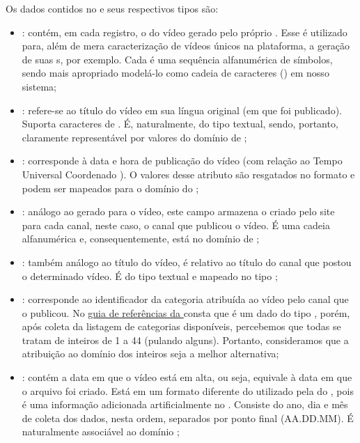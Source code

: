   Os dados contidos no  e seus respectivos tipos são:

  \begin{itemize}
    \item {}: contém, em cada registro, o  do vídeo gerado pelo próprio . Esse  é utilizado para, além de mera caracterização de vídeos únicos na plataforma, a geração de suas s, por exemplo. Cada  é uma sequência alfanumérica de símbolos, sendo mais apropriado modelá-lo como cadeia de caracteres () em nosso sistema;
    \item {}: refere-se ao título do vídeo em sua língua original (em que foi publicado). Suporta caracteres de . É, naturalmente, do tipo textual, sendo, portanto, claramente representável por valores do domínio de ;
    \item {}: corresponde à data e hora de publicação do vídeo (com relação ao Tempo Universal Coordenado ). O valores desse atributo são resgatados no formato \href{https://www.w3.org/TR/NOTE-datetime}{} e podem ser mapeados para o domínio  do ;
    \item {}: análogo ao  gerado para o vídeo, este campo armazena o  criado pelo site para cada canal, neste caso, o canal que publicou o vídeo. É uma cadeia alfanumérica e, consequentemente, está no domínio de ;
    \item {}: também análogo ao título do vídeo, é relativo ao título do canal que postou o determinado vídeo. É do tipo textual e mapeado no tipo ;
    \item {}: corresponde ao identificador da categoria atribuída ao vídeo pelo canal que o publicou. No \href{https://developers.google.com/youtube/v3/docs/videos?hl=pt-br#snippet.categoryId}{guia de referências da } consta que é um dado do tipo , porém, após coleta da listagem de categorias disponíveis, percebemos que todas se tratam de inteiros de 1 a 44 (pulando alguns). Portanto, consideramos que a atribuição ao domínio dos inteiros seja a melhor alternativa;
    \item {}: contém a data em que o vídeo está em alta, ou seja, equivale à data em que o arquivo  foi criado. Está em um formato diferente do utilizado pela  do , pois é uma informação adicionada artificialmente no . Consiste do ano, dia e mês de coleta dos dados, nesta ordem, separados por ponto final (AA.DD.MM). É naturalmente associável ao domínio ;

\end{itemize}
